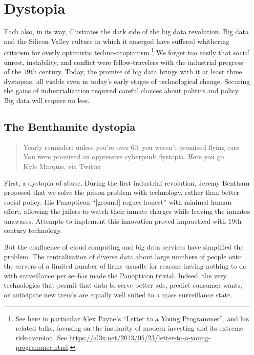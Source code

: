 \documentclass[12pt]{article}
\begin{document}
\section{Dystopia}
\label{sec:dystopic-future}


Each also, in its way, illustrates the dark side of the big data
revolution. Big data and the Silicon Valley culture in which it emerged have
suffered whithering criticism for overly optimistic
techno-utopianism.\footnote{See here in particular Alex Payne's
  ``Letter to a Young Programmer'', and his related talks, focusing on
  the insularity of modern investing and its extreme
  risk-aversion. See
  \url{https://al3x.net/2013/05/23/letter-to-a-young-programmer.html}.}
We forget too easily that social unrest, instability, and conflict
were fellow-travelers with the industrial progress of the 19th
century. Today, the promise of big data brings with it at least three
dystopias, all visible even in today's early stages of technological
change. Securing the gains of industrialization required careful
choices about politics and policy. Big data will require no less. 

\subsection{The Benthamite dystopia}
\label{sec:benthamite-dystopia}

\begin{quote}
  Yearly reminder: unless you're over 60, you weren't promised flying
  cars. You were promised an oppressive cyberpunk dystopia. Here you
  go.\\

  \vspace{12pt}
  Kyle Marquis, via Twitter
\end{quote}

First, a dystopia of abuse. During the first industrial revolution,
Jeremy Bentham proposed that we solve the prison problem with
technology, rather than better social policy. His Panopticon
``[ground] rogues honest'' with minimal human effort, allowing the
jailers to watch their inmate charges while leaving the inmates
unawares. Attempts to implement this innovation proved impractical
with 19th century technology.

But the confluence of cloud computing and big data services have
simplified the problem. The centralization of diverse data about large
numbers of people onto the servers of a limited number of
firms--usually for reasons having nothing to do with surveillance per
se--has made the Panopticon trivial. Indeed, the very technologies
that permit that data to serve better ads, predict consumer wants, or
anticipate new trends are equally well suited to a mass surveillance
state. 
\end{document}
